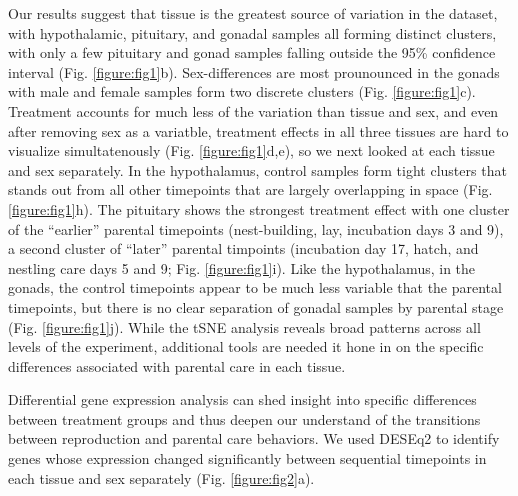 Our results suggest that tissue is the greatest source of variation in
the dataset, with hypothalamic, pituitary, and gonadal samples all
forming distinct clusters, with only a few pituitary and gonad samples
falling outside the 95\% confidence interval (Fig. \ref{figure:fig1}b).
Sex-differences are most prounounced in the gonads with male and female
samples form two discrete clusters (Fig. \ref{figure:fig1}c). Treatment
accounts for much less of the variation than tissue and sex, and even
after removing sex as a variatble, treatment effects in all three
tissues are hard to visualize simultatenously (Fig.
\ref{figure:fig1}d,e), so we next looked at each tissue and sex
separately. In the hypothalamus, control samples form tight clusters
that stands out from all other timepoints that are largely overlapping
in space (Fig. \ref{figure:fig1}h). The pituitary shows the strongest
treatment effect with one cluster of the ``earlier'' parental timepoints
(nest-building, lay, incubation days 3 and 9), a second cluster of
``later'' parental timpoints (incubation day 17, hatch, and nestling
care days 5 and 9; Fig. \ref{figure:fig1}i). Like the hypothalamus, in
the gonads, the control timepoints appear to be much less variable that
the parental timepoints, but there is no clear separation of gonadal
samples by parental stage (Fig. \ref{figure:fig1}j). While the tSNE
analysis reveals broad patterns across all levels of the experiment,
additional tools are needed it hone in on the specific differences
associated with parental care in each tissue.

Differential gene expression analysis can shed insight into specific
differences between treatment groups and thus deepen our understand of
the transitions between reproduction and parental care behaviors. We
used DESEq2 to identify genes whose expression changed significantly
between sequential timepoints in each tissue and sex separately (Fig.
\ref{figure:fig2}a).

